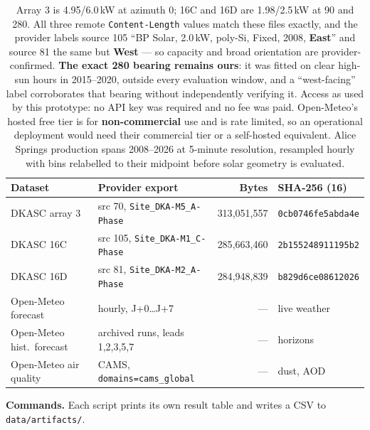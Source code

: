 \documentclass[11pt,a4paper]{article}
\newcommand{\unit}[1]{\,\textsf{\small #1}}
\begin{document}
\begin{table}[H]
\centering\small
\begin{tabular}{@{}llrl@{}}
\toprule
\textbf{Dataset} & \textbf{Provider export} & \textbf{Bytes} & \textbf{SHA-256 (16)} \\
\midrule
DKASC array 3 & src 70, \texttt{Site\_DKA-M5\_A-Phase} & 313{,}051{,}557 & \texttt{0cb0746fe5abda4e} \\
DKASC 16C & src 105, \texttt{Site\_DKA-M1\_C-Phase} & 285{,}663{,}460 & \texttt{2b155248911195b2} \\
DKASC 16D & src 81, \texttt{Site\_DKA-M2\_A-Phase} & 284{,}948{,}839 & \texttt{b829d6ce08612026} \\
Open-Meteo forecast & hourly, J+0\dots J+7 & --- & live weather \\
Open-Meteo hist.\ forecast & archived runs, leads 1,2,3,5,7 & --- & horizons \\
Open-Meteo air quality & CAMS, \texttt{domains=cams\_global} & --- & dust, AOD \\
\bottomrule
\end{tabular}
\caption{Array 3 is 4.95/6.0\unit{kW} at azimuth 0\textdegree; 16C and 16D are
1.98/2.5\unit{kW} at 90\textdegree{} and 280\textdegree. All three remote
\texttt{Content-Length} values match these files exactly, and the provider labels
source 105 ``BP Solar, 2.0\,kW, poly-Si, Fixed, 2008, \textbf{East}'' and source
81 the same but \textbf{West} --- so capacity and broad orientation are
provider-confirmed. \textbf{The exact 280\textdegree{} bearing remains ours}:
it was fitted on clear high-sun hours in 2015--2020, outside every evaluation
window, and a ``west-facing'' label corroborates that bearing without
independently verifying it. Access as used by this prototype: no API key was
required and no fee was paid. Open-Meteo's hosted free tier is for \textbf{non-commercial} use and
is rate limited, so an operational deployment would need their commercial tier
or a self-hosted equivalent. Alice Springs production spans 2008--2026 at
5-minute resolution, resampled hourly with bins relabelled to their midpoint
before solar geometry is evaluated.}
\end{table}


\textbf{Commands.} Each script prints its own result table and writes a CSV to
\texttt{data/artifacts/}.
\end{document}
